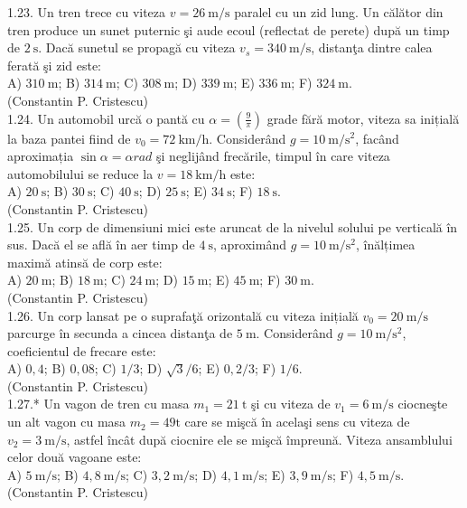 1.23. Un tren trece cu viteza $v=26 \mathrm{~m} / \mathrm{s}$ paralel cu un zid lung. Un călător din tren produce un sunet puternic şi aude ecoul (reflectat de perete) după un timp de $2 \mathrm{~s}$. Dacă sunetul se propagă cu viteza $v_{s}=340 \mathrm{~m} / \mathrm{s}$, distanţa dintre calea ferată şi zid este:\\ A) $310 \mathrm{~m}$; B) $314 \mathrm{~m}$; C) $308 \mathrm{~m}$; D) $339 \mathrm{~m}$; E) $336 \mathrm{~m}$; F) $324 \mathrm{~m}$.\\ (Constantin P. Cristescu)\\

1.24. Un automobil urcă o pantă cu $\alpha=\left(\frac{9}{\pi}\right)$ grade fără motor, viteza sa inițială la baza pantei fiind de $v_{0}=72 \mathrm{~km} / \mathrm{h}$. Considerând $g=10 \mathrm{~m} / \mathrm{s}^{2}$, facând aproximația $\sin \alpha=\alpha rad$ şi neglijând frecările, timpul în care viteza automobilului se reduce la $v=18 \mathrm{~km} / \mathrm{h}$ este:\\ A) $20 \mathrm{~s}$; B) $30 \mathrm{~s}$; C) $40 \mathrm{~s}$; D) $25 \mathrm{~s}$; E) $34 \mathrm{~s}$; F) $18 \mathrm{~s}$.\\ (Constantin P. Cristescu)\\

1.25. Un corp de dimensiuni mici este aruncat de la nivelul solului pe verticală în sus. Dacă el se află în aer timp de $4 \mathrm{~s}$, aproximând $g=10 \mathrm{~m} / \mathrm{s}^{2}$, înălțimea maximă atinsă de corp este:\\ A) $20 \mathrm{~m}$; B) $18 \mathrm{~m}$; C) $24 \mathrm{~m}$; D) $15 \mathrm{~m}$; E) $45 \mathrm{~m}$; F) $30 \mathrm{~m}$.\\ (Constantin P. Cristescu)\\

1.26. Un corp lansat pe o suprafaţă orizontală cu viteza inițială $v_{0}=20 \mathrm{~m} / \mathrm{s}$ parcurge în secunda a cincea distanţa de $5 \mathrm{~m}$. Considerând $g=10 \mathrm{~m} / \mathrm{s}^{2}$, coeficientul de frecare este:\\ A) $0,4$; B) $0,08$; C) $1 / 3$; D) $\sqrt{3} / 6$; E) $0,2 / 3$; F) $1 / 6$.\\ (Constantin P. Cristescu)\\

1.27.* Un vagon de tren cu masa $m_{1}=21 \mathrm{~t}$ şi cu viteza de $v_{1}=6 \mathrm{~m} / \mathrm{s}$ ciocneşte un alt vagon cu masa $m_{2}=49 \mathrm{t}$ care se mişcă în acelaşi sens cu viteza de $v_{2}=3 \mathrm{~m} / \mathrm{s}$, astfel încât după ciocnire ele se mişcă împreună. Viteza ansamblului celor două vagoane este:\\ A) $5 \mathrm{~m} / \mathrm{s}$; B) $4,8 \mathrm{~m} / \mathrm{s}$; C) $3,2 \mathrm{~m} / \mathrm{s}$; D) $4,1 \mathrm{~m} / \mathrm{s}$; E) $3,9 \mathrm{~m} / \mathrm{s}$; F) $4,5 \mathrm{~m} / \mathrm{s}$.\\ (Constantin P. Cristescu)\\

